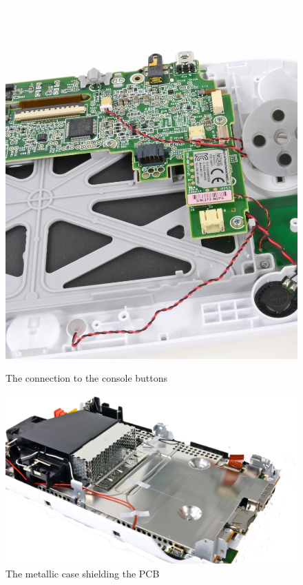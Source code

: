 \documentclass[11pt,a4paper,titlepage]{article}
\begin{document}
\begin{figure}[h]
\begin{minipage}{.5 \textwidth}
            \includegraphics[width = .8\textwidth]{buttons.png}
            \caption{The connection to the console buttons}
            \label{fig:button}
          \end{minipage}
          \hspace{5mm}
          \begin{minipage}{.5 \textwidth}
            \centering
            \includegraphics[width = .8\textwidth]{shield.png}
            \caption{The metallic case shielding the PCB}
            \label{fig:metalliccase}
          \end{minipage}
        \end{figure}
\end{document}

